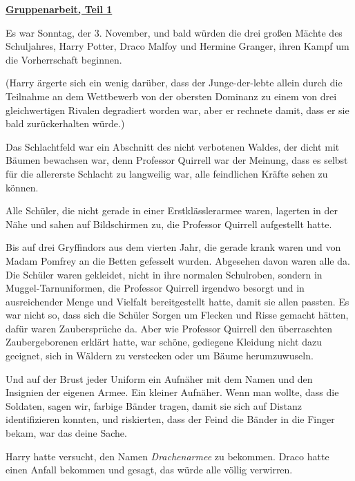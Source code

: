 

\hypertarget{gruppenarbeit-teil-1}{%

\textbf{\uline{Gruppenarbeit, Teil 1}}

Es war Sonntag, der 3. November, und bald würden die drei großen Mächte des Schuljahres, Harry Potter, Draco Malfoy und Hermine Granger, ihren Kampf um die Vorherrschaft beginnen.

(Harry ärgerte sich ein wenig darüber, dass der Junge-der-lebte allein durch die Teilnahme an dem Wettbewerb von der obersten Dominanz zu einem von drei gleichwertigen Rivalen degradiert worden war, aber er rechnete damit, dass er sie bald zurückerhalten würde.)

Das Schlachtfeld war ein Abschnitt des nicht verbotenen Waldes, der dicht mit Bäumen bewachsen war, denn Professor Quirrell war der Meinung, dass es selbst für die allererste Schlacht zu langweilig war, alle feindlichen Kräfte sehen zu können.

Alle Schüler, die nicht gerade in einer Erstklässlerarmee waren, lagerten in der Nähe und sahen auf Bildschirmen zu, die Professor Quirrell aufgestellt hatte.

Bis auf drei Gryffindors aus dem vierten Jahr, die gerade krank waren und von Madam Pomfrey an die Betten gefesselt wurden. Abgesehen davon waren alle da. Die Schüler waren gekleidet, nicht in ihre normalen Schulroben, sondern in Muggel-Tarnuniformen, die Professor Quirrell irgendwo besorgt und in ausreichender Menge und Vielfalt bereitgestellt hatte, damit sie allen passten. Es war nicht so, dass sich die Schüler Sorgen um Flecken und Risse gemacht hätten, dafür waren Zaubersprüche da. Aber wie Professor Quirrell den überraschten Zaubergeborenen erklärt hatte, war schöne, gediegene Kleidung nicht dazu geeignet, sich in Wäldern zu verstecken oder um Bäume herumzuwuseln.

Und auf der Brust jeder Uniform ein Aufnäher mit dem Namen und den Insignien der eigenen Armee. Ein kleiner Aufnäher. Wenn man wollte, dass die Soldaten, sagen wir, farbige Bänder tragen, damit sie sich auf Distanz identifizieren konnten, und riskierten, dass der Feind die Bänder in die Finger bekam, war das deine Sache.

Harry hatte versucht, den Namen \emph{Drachenarmee} zu bekommen. Draco hatte einen Anfall bekommen und gesagt, das würde alle völlig verwirren.

}
